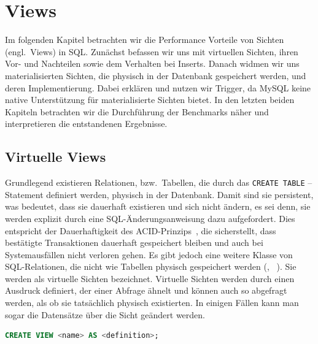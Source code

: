 
\chapter{Views}\label{ch:views}
Im folgenden Kapitel betrachten wir die Performance Vorteile von Sichten (engl.\ Views) in SQL\@.
Zunächst befassen wir uns mit virtuellen Sichten, ihren Vor- und Nachteilen sowie dem Verhalten bei Inserts.
Danach widmen wir uns materialisierten Sichten, die physisch in der Datenbank gespeichert werden, und deren Implementierung.
Dabei erklären und nutzen wir Trigger, da MySQL keine native Unterstützung für materialisierte Sichten bietet.
In den letzten beiden Kapiteln betrachten wir die Durchführung der Benchmarks näher und interpretieren die entstandenen Ergebnisse.

\section{Virtuelle Views}\label{sec:virtuelle-views}

Grundlegend existieren Relationen, bzw.\ Tabellen, die durch das \texttt{CREATE TABLE} – Statement definiert werden, physisch in der Datenbank.
Damit sind sie persistent, was bedeutet, dass sie dauerhaft existieren und sich nicht ändern, es sei denn, sie werden explizit durch eine SQL-Änderungsanweisung dazu aufgefordert.
Dies entspricht der Dauerhaftigkeit des ACID-Prinzips~\cite{acid_eigenschaften}, die sicherstellt, dass bestätigte Transaktionen dauerhaft gespeichert bleiben und auch bei Systemausfällen nicht verloren gehen.
Es gibt jedoch eine weitere Klasse von SQL-Relationen, die nicht wie Tabellen physisch gespeichert werden (\cite[341--349, 353--366]{garcia2008database}, ~\cite[pp. 276--281]{schwartz2012high}).
Sie werden als virtuelle Sichten bezeichnet.
Virtuelle Sichten werden durch einen Ausdruck definiert, der einer Abfrage ähnelt und können auch so abgefragt werden, als ob sie tatsächlich physisch existierten.
In einigen Fällen kann man sogar die Datensätze über die Sicht geändert werden.
\vspace{-5pt}
\begin{lstlisting}[language=SQL,caption=Allgemeine View-Deklaration,label={lst:create_view}]
CREATE VIEW <name> AS <definition>;
\end{lstlisting}
\vspace{-5pt}

